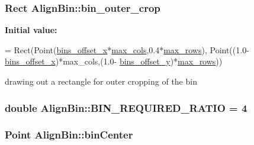 \subsubsection[{\texorpdfstring{bin\+\_\+outer\+\_\+crop}{bin_outer_crop}}]{\setlength{\rightskip}{0pt plus 5cm}Rect Align\+Bin\+::bin\+\_\+outer\+\_\+crop}\hypertarget{classAlignBin_af344ab74a824162b23ca841b8a4048df}{}\label{classAlignBin_af344ab74a824162b23ca841b8a4048df}
{\bfseries Initial value\+:}
\begin{DoxyCode}
= Rect(Point(\hyperlink{classAlignBin_ad994bd3d6dcef6be1f1aca871e6ed1e1}{bins\_offset\_x}*\hyperlink{classAlignBin_af984c9ffbeeebfae750ac2237c518ec2}{max\_cols},0.4*\hyperlink{classAlignBin_a193530ae6dfca9e25a6b77e19b6f4f52}{max\_rows}),
                Point((1.0-\hyperlink{classAlignBin_ad994bd3d6dcef6be1f1aca871e6ed1e1}{bins\_offset\_x})*max\_cols,(1.0-
      \hyperlink{classAlignBin_ae70b486d82daa5ee833b7cd2bd7a8747}{bins\_offset\_y})*\hyperlink{classAlignBin_a193530ae6dfca9e25a6b77e19b6f4f52}{max\_rows}))
\end{DoxyCode}


drawing out a rectangle for outer cropping of the bin 

\subsubsection[{\texorpdfstring{B\+I\+N\+\_\+\+R\+E\+Q\+U\+I\+R\+E\+D\+\_\+\+R\+A\+T\+IO}{BIN_REQUIRED_RATIO}}]{\setlength{\rightskip}{0pt plus 5cm}double Align\+Bin\+::\+B\+I\+N\+\_\+\+R\+E\+Q\+U\+I\+R\+E\+D\+\_\+\+R\+A\+T\+IO = 4}\hypertarget{classAlignBin_adedde6dfe9b6e35c372fa034cf401351}{}\label{classAlignBin_adedde6dfe9b6e35c372fa034cf401351}
\subsubsection[{\texorpdfstring{bin\+Center}{binCenter}}]{\setlength{\rightskip}{0pt plus 5cm}Point Align\+Bin\+::bin\+Center}\hypertarget{classAlignBin_aa3f546821744ade1859388e68a6b862a}{}\label{classAlignBin_aa3f546821744ade1859388e68a6b862a}


